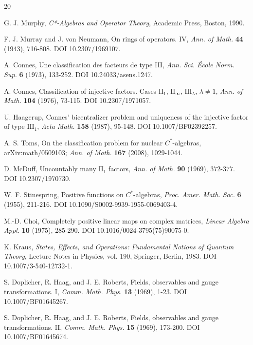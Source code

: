 \documentclass[11pt,letterpaper]{article}
\theoremstyle{definition}
\theoremstyle{remark}
\begin{document}
\begin{thebibliography}{20}

G. J. Murphy, \emph{C*-Algebras and Operator Theory}, Academic Press, Boston, 1990.

F. J. Murray and J. von Neumann, On rings of operators. IV, \emph{Ann. of Math.} \textbf{44} (1943), 716-808. DOI 10.2307/1969107.

A. Connes, Une classification des facteurs de type III, \emph{Ann. Sci. \'Ecole Norm. Sup.} \textbf{6} (1973), 133-252. DOI 10.24033/asens.1247.

A. Connes, Classification of injective factors. Cases $\mathrm{II}_1$, $\mathrm{II}_\infty$, $\mathrm{III}_\lambda$, $\lambda \neq 1$, \emph{Ann. of Math.} \textbf{104} (1976), 73-115. DOI 10.2307/1971057.

U. Haagerup, Connes' bicentralizer problem and uniqueness of the injective factor of type $\mathrm{III}_1$, \emph{Acta Math.} \textbf{158} (1987), 95-148. DOI 10.1007/BF02392257.

A. S. Toms, On the classification problem for nuclear $C^*$-algebras, arXiv:math/0509103; \emph{Ann. of Math.} \textbf{167} (2008), 1029-1044.

D. McDuff, Uncountably many $\mathrm{II}_1$ factors, \emph{Ann. of Math.} \textbf{90} (1969), 372-377. DOI 10.2307/1970730.

W. F. Stinespring, Positive functions on $C^*$-algebras, \emph{Proc. Amer. Math. Soc.} \textbf{6} (1955), 211-216. DOI 10.1090/S0002-9939-1955-0069403-4.

M.-D. Choi, Completely positive linear maps on complex matrices, \emph{Linear Algebra Appl.} \textbf{10} (1975), 285-290. DOI 10.1016/0024-3795(75)90075-0.

K. Kraus, \emph{States, Effects, and Operations: Fundamental Notions of Quantum Theory}, Lecture Notes in Physics, vol. 190, Springer, Berlin, 1983. DOI 10.1007/3-540-12732-1.

S. Doplicher, R. Haag, and J. E. Roberts, Fields, observables and gauge transformations. I, \emph{Comm. Math. Phys.} \textbf{13} (1969), 1-23. DOI 10.1007/BF01645267.

S. Doplicher, R. Haag, and J. E. Roberts, Fields, observables and gauge transformations. II, \emph{Comm. Math. Phys.} \textbf{15} (1969), 173-200. DOI 10.1007/BF01645674.


\end{thebibliography}
\end{document}
